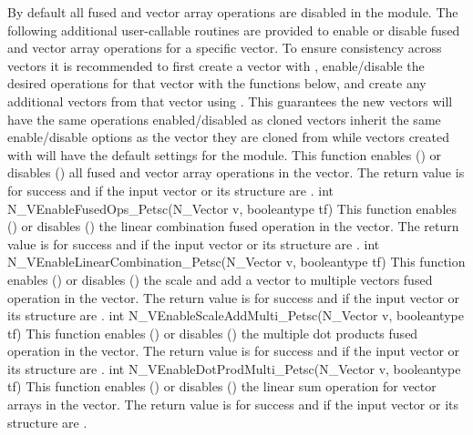 By default all fused and vector array operations are disabled in the {\nvecpetsc}
module. The following additional user-callable routines are provided to
enable or disable fused and vector array operations for a specific vector. To
ensure consistency across vectors it is recommended to first create a vector
with , enable/disable the desired operations for that vector
with the functions below, and create any additional vectors from that vector
using . This guarantees the new vectors will have the same
operations enabled/disabled as cloned vectors inherit the same enable/disable
options as the vector they are cloned from while vectors created with
 will have the default settings for the {\nvecpetsc} module.
{
  This function enables () or disables () all fused and
  vector array operations in the {\petsc} vector. The return value is  for
  success and  if the input vector or its  structure are .
}
{
  int N\_VEnableFusedOps\_Petsc(N\_Vector v, booleantype tf)
}
{
  This function enables () or disables () the linear
  combination fused operation in the {\petsc} vector. The return value is  for
  success and  if the input vector or its  structure are .
}
{
  int N\_VEnableLinearCombination\_Petsc(N\_Vector v, booleantype tf)
}
{
  This function enables () or disables () the scale and
  add a vector to multiple vectors fused operation in the {\petsc} vector. The
  return value is  for success and  if the input vector or its
   structure are .
}
{
  int N\_VEnableScaleAddMulti\_Petsc(N\_Vector v, booleantype tf)
}
{
  This function enables () or disables () the multiple
  dot products fused operation in the {\petsc} vector. The return value is 
  for success and  if the input vector or its  structure are
  .
}
{
  int N\_VEnableDotProdMulti\_Petsc(N\_Vector v, booleantype tf)
}
{
  This function enables () or disables () the linear sum
  operation for vector arrays in the {\petsc} vector. The return value is  for
  success and  if the input vector or its  structure are .
}
